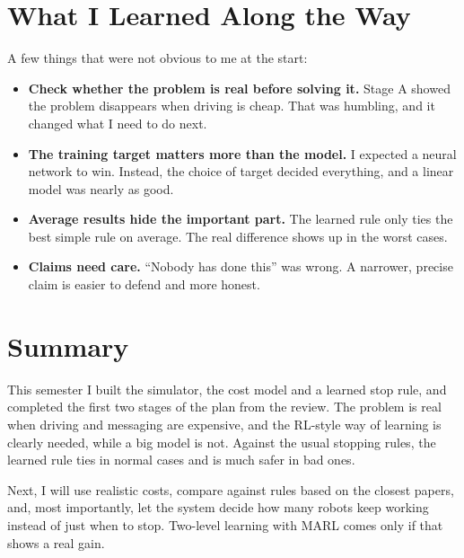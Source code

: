 \documentclass[11pt,a4paper]{article}
\begin{document}
\section{What I Learned Along the Way}

A few things that were not obvious to me at the start:
\begin{itemize}
  \item \textbf{Check whether the problem is real before solving it.} Stage A showed the problem disappears when driving is cheap. That was humbling, and it changed what I need to do next.
  \item \textbf{The training target matters more than the model.} I expected a neural network to win. Instead, the choice of target decided everything, and a linear model was nearly as good.
  \item \textbf{Average results hide the important part.} The learned rule only ties the best simple rule on average. The real difference shows up in the worst cases.
  \item \textbf{Claims need care.} ``Nobody has done this'' was wrong. A narrower, precise claim is easier to defend and more honest.
\end{itemize}

\section{Summary}

This semester I built the simulator, the cost model and a learned stop rule, and completed the first two stages of the plan from the review. The problem is real when driving and messaging are expensive, and the RL-style way of learning is clearly needed, while a big model is not. Against the usual stopping rules, the learned rule ties in normal cases and is much safer in bad ones.

Next, I will use realistic costs, compare against rules based on the closest papers, and, most importantly, let the system decide how many robots keep working instead of just when to stop. Two-level learning with MARL comes only if that shows a real gain.



\end{document}
